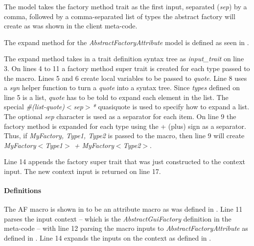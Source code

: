
The model takes the factory method trait as the first input, separated (\textit{sep}) by a comma, followed by a comma-separated list of types the abstract factory will create as was shown in the client meta-code.

The expand method for the \textit{AbstractFactoryAttribute} model is defined as seen in .


The expand method takes in a trait definition syntax tree as \textit{input\_trait} on line 3.
On lines 4 to 11 a factory method super trait is created for each type passed to the macro.
Lines 5 and 6 create local variables to be passed to \textit{quote}.
Line 8 uses a \textit{syn} helper function to turn a \textit{quote} into a syntax tree.
Since \textit{types} defined on line 5 is a list, \textit{quote} has to be told to expand each element in the list.
The special \textit{\#(list-quote)$<$sep$>$*} quasiquote is used to specify how to expand a list.
The optional \textit{sep} character is used as a separator for each item.
On line 9 the factory method is expanded for each type using the + (plus) sign as a separator.
Thus, if \textit{MyFactory, Type1, Type2} is passed to the macro, then line 9 will create \textit{MyFactory$<$Type1$>$ + MyFactory$<$Type2$>$}.

Line 14 appends the factory super trait that was just constructed to the context input.
The new context input is returned on line 17.

\paragraph{Definitions}
The AF macro is shown in  to be an attribute macro as was defined in .
Line 11 parses the input context -- which is the \textit{AbstractGuiFactory} definition in the meta-code -- with line 12 parsing the macro inputs to \textit{AbstractFactoryAttribute} as defined in .
Line 14 expands the inputs on the context as defined in .


